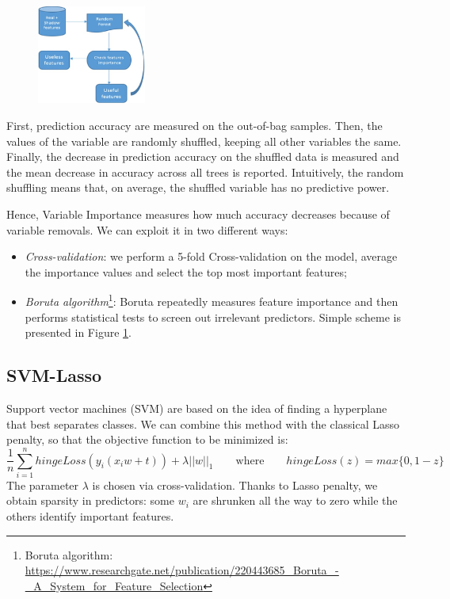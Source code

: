\documentclass[a4paper,11pt, oneside]{article}  %
\begin{document}
\begin{figure}
	\includegraphics[width=0.318\textwidth]{Boruta-Algorithm.jpg}
	\label{fig2}
\end{figure}
First, prediction accuracy are measured on the out-of-bag samples. Then, the values of the variable are randomly shuffled, keeping all other variables the same.  Finally, the decrease in prediction accuracy on the shuffled data is measured and the mean decrease in accuracy across all trees is reported.  Intuitively, the random shuffling means that, on average, the shuffled variable has no predictive power. 

Hence, Variable Importance measures how much accuracy decreases because of variable removals. We can exploit it in two different ways:
\begin{itemize}
	\item \textit{Cross-validation}: we perform a 5-fold Cross-validation on the model, average the importance values and select the top most important features;
	\item \textit{Boruta algorithm}\footnote{Boruta algorithm: \url{https://www.researchgate.net/publication/220443685_Boruta_-_A_System_for_Feature_Selection}}: Boruta repeatedly measures feature importance and then performs statistical tests to screen out irrelevant predictors. Simple scheme is presented in Figure \ref{fig2}.
\end{itemize} 
\newpage

\subsection{SVM-Lasso}
Support vector machines (SVM) are based on the idea of finding a hyperplane that best separates classes. We can combine this method with the classical Lasso penalty,  so that the objective function to be minimized is:
\begin{equation*}
	\dfrac{1}{n} \sum_{i=1}^n hingeLoss(y_i(x_i w + t)) + \lambda ||w||_1  \qquad	\text{where} \qquad  hingeLoss(z) = max\{0, 1-z\}
\end{equation*}
The parameter $\lambda$ is chosen via cross-validation. Thanks to Lasso penalty, we obtain sparsity in predictors: some $w_i$ are shrunken all the way to zero while the others identify important features. 
\end{document}
